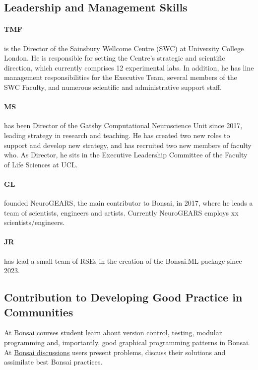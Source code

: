 \subsection*{Leadership and Management Skills}

\paragraph{TMF} is the Director of the Sainsbury Wellcome Centre (SWC) at
University College London. He is responsible for setting the Centre’s strategic
and scientific direction, which currently comprises 12 experimental labs. In
addition, he has line management responsibilities for the Executive Team,
several members of the SWC Faculty, and numerous scientific and administrative
support staff.

\paragraph{MS} has been Director of the Gatsby Computational
Neuroscience Unit since 2017, leading strategy in research and teaching. He has
created two new roles to support and develop new strategy, and has recruited
two new members of faculty who.  As Director, he sits in the Executive
Leadership Committee of the Faculty of Life Sciences at UCL.

\paragraph{GL} founded NeuroGEARS, the main contributor to
Bonsai, in 2017, where he leads a team of scientists, engineers and artists.
Currently NeuroGEARS employs xx scientists/engineers.

\paragraph{JR} has lead a small team of RSEs in the
creation of the Bonsai.ML package since 2023.

\subsection*{Contribution to Developing Good Practice in Communities}

At Bonsai courses student learn about version control, testing, modular
programming and, importantly, good graphical programming patterns in Bonsai.
%
At \href{https://github.com/orgs/bonsai-rx/discussions}{Bonsai discussions}
users present problems, discuss their solutions and assimilate best
Bonsai practices.

